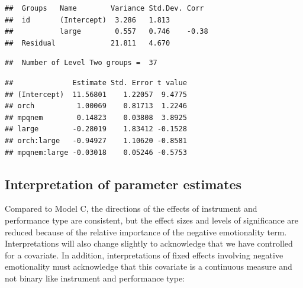 \documentclass[
]{krantz}
\begin{document}
\begin{verbatim}
##  Groups   Name        Variance Std.Dev. Corr 
##  id       (Intercept)  3.286   1.813         
##           large        0.557   0.746    -0.38
##  Residual             21.811   4.670
\end{verbatim}

\begin{verbatim}
##  Number of Level Two groups =  37
\end{verbatim}

\begin{verbatim}
##              Estimate Std. Error t value
## (Intercept)  11.56801    1.22057  9.4775
## orch          1.00069    0.81713  1.2246
## mpqnem        0.14823    0.03808  3.8925
## large        -0.28019    1.83412 -0.1528
## orch:large   -0.94927    1.10620 -0.8581
## mpqnem:large -0.03018    0.05246 -0.5753
\end{verbatim}

\hypertarget{interp:modeld}{%
\subsection{Interpretation of parameter estimates}\label{interp:modeld}}

Compared to Model C, the directions of the effects of instrument and performance type are consistent, but the effect sizes and levels of significance are reduced because of the relative importance of the negative emotionality term. Interpretations will also change slightly to acknowledge that we have controlled for a covariate. In addition, interpretations of fixed effects involving negative emotionality must acknowledge that this covariate is a continuous measure and not binary like instrument and performance type:
\end{document}
